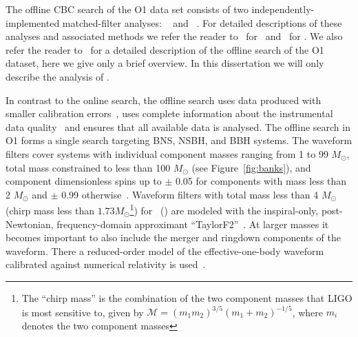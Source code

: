 The offline \ac{CBC} search of the \ac{O1} data set consists of two independently-implemented matched-filter
analyses: \gstlal~\citep{Messick:2016aqy} and
\pycbc~\citep{Usman:2015kfa}.
For detailed descriptions of these analyses and associated methods we refer the reader
to~\citep{Babak:2012zx,Canton:2014ena,Usman:2015kfa} for \pycbc\
and~\citep{Cannon:2011vi, Cannon:2012zt, Privitera:2013xza, Messick:2016aqy} for \gstlal.
We also refer the reader to~\citep{TheLIGOScientific:2016pea, TheLIGOScientific:2016qqj} for a detailed
description of the offline search of the \ac{O1} dataset, here we give only a brief overview. In this dissertation we will only describe the analysis of \pycbc.

In contrast to the online search, the offline search uses data produced with
smaller calibration errors~\citep{Abbott:2016jsd}, uses complete information about the instrumental
data quality~\citep{TheLIGOScientific:2016zmo} and ensures that all available data is analysed.
The offline search in \ac{O1} forms a single search targeting \ac{BNS}, \ac{NSBH}, and \ac{BBH} systems. The
waveform filters cover systems with individual
component masses ranging from 1 to 99 $M_{\odot}$, total mass
constrained to less than 100 $M_{\odot}$ (see Figure~\ref{fig:banks}), and component dimensionless spins up to $\pm$ 0.05
for components with mass less than 2 $M_{\odot}$ and $\pm$ 0.99 otherwise~\citep{TheLIGOScientific:2016pea,Capano:2016dsf}.
Waveform filters with total mass less than 4 $M_{\odot}$ (chirp mass less than
$1.73 {M}_{\odot}$\footnote{\label{foot:note1}The
``chirp mass'' is the combination of the two component masses that
\ac{LIGO} is most sensitive to, given by $\mathcal{M} = (m_1 m_2)^{3/5} (m_1 + m_2)^{-1/5}$, where
$m_i$ denotes the two component masses})
for \pycbc\ (\gstlal) are modeled with the
inspiral-only, post-Newtonian, frequency-domain approximant
``TaylorF2''~\citep{Arun:2008kb,Bohe:2013cla,Blanchet:2013haa,Bohe:2015ana,mishra2016ready}.
At larger masses it becomes important to also include the merger and ringdown components of the waveform.
There a reduced-order model of the effective-one-body waveform calibrated against numerical
relativity is used~\citep{Taracchini:2013rva,Purrer:2015tud}. 
